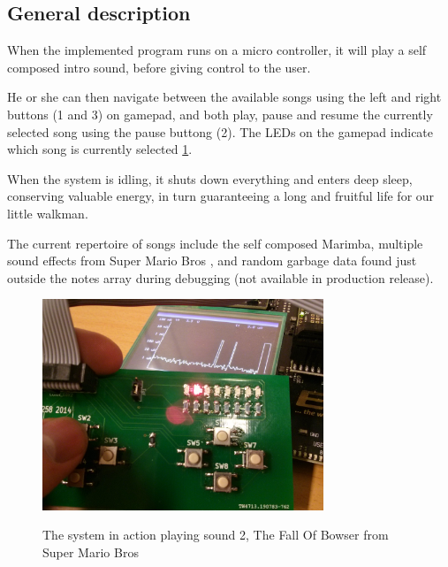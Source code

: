 \subsection{General description}

When the implemented program runs on a micro controller, it will play a self composed intro sound, before giving control to the user.

He or she can then navigate between the available songs using the left and right buttons (1 and 3) on gamepad, and both play, pause and resume the currently selected song using the pause buttong (2).
The LEDs on the gamepad indicate which song is currently selected \ref{fig:system-action}.

When the system is idling, it shuts down everything and enters deep sleep, conserving valuable energy, in turn guaranteeing a long and fruitful life for our little walkman.

The current repertoire of songs include the self composed Marimba, multiple sound effects from Super Mario Bros \cite{mariobros}, and random garbage data found just outside the notes array during debugging (not available in production release).

\begin{figure}[H]
    \centering
    \includegraphics[width=0.75\textwidth]{figures/system-in-action.jpg}
    \label{fig:system-action}
    \caption{The system in action playing sound 2, The Fall Of Bowser from Super Mario Bros}
\end{figure}
